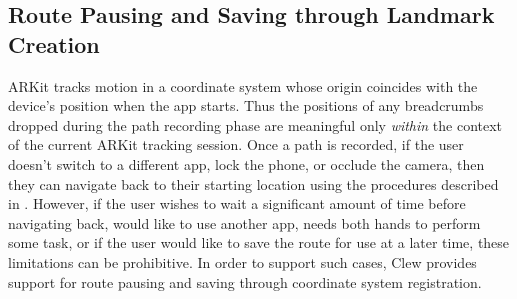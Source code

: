 \documentclass[chi_draft]{sigchi}
\begin{document}
\subsection{Route Pausing and Saving through Landmark Creation}

ARKit tracks motion in a coordinate system whose origin coincides with the device's position when the app starts.  Thus the positions of any breadcrumbs dropped during the path recording phase are meaningful only \emph{within} the context of the current ARKit tracking session.  Once a path is recorded, if the user doesn't switch to a different app, lock the phone, or occlude the camera, then they can navigate back to their starting location using the procedures described in \emph{}.  However, if the user wishes to wait a significant amount of time before navigating back, would like to use another app, needs both hands to perform some task, or if the user would like to save the route for use at a later time, these limitations can be prohibitive.  In order to support such cases, Clew provides support for route pausing and saving through coordinate system registration.
\end{document}
